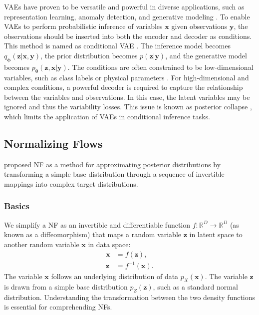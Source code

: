 \acp{VAE} have proven to be versatile and powerful in
diverse applications, such as representation learning, anomaly detection, and generative modeling \citep{Mienye2025}. To enable \acp{VAE} to perform probabilistic inference of variables $\boldsymbol{x}$ given observations $\boldsymbol{y}$, the observations should be inserted into both the encoder and decoder as conditions. This method is named as conditional \ac{VAE} \citep{sohn2015cvae}. The inference model becomes $q_{\boldsymbol{\phi}}(\boldsymbol{z}|\boldsymbol{x}, \boldsymbol{y})$, the prior distribution becomes $p(\boldsymbol{z}|\boldsymbol{y})$, and the generative model becomes $p_{\boldsymbol{\theta}}(\boldsymbol{z}, \boldsymbol{x}|\boldsymbol{y})$. The conditions are often constrained to be low-dimensional variables, such as class labels \citep{sohn2015cvae} or physical parameters \citep{martínezpalomera2020pelsvae}. For high-dimensional and complex conditions, a powerful decoder is required to capture the relationship between the variables and observations. In this case, the latent variables may be ignored and thus the variability losses. This issue is known as posterior collapse \citep{bowman2016cvae, mccarthy2020cvae}, which limits the application of \acp{VAE} in conditional inference tasks.

\subsection{Normalizing Flows}
\citeauthor{rezende2016} \citeyearpar{rezende2016} proposed \acf{NF} as a method for approximating posterior distributions by transforming a simple base distribution through a sequence of invertible mappings into complex target distributions. 

\subsubsection{Basics}
We simplify a \ac{NF} as an invertible and differentiable function $f:\mathbb{R}^D\rightarrow\mathbb{R}^D$ (as known as a diffeomorphism) that maps a random variable $\boldsymbol{z}$ in latent space to another random variable $\boldsymbol{x}$ in data space:
\begin{subequations}
    \begin{align}
        \label{eq:xfz}
        \boldsymbol{x} &= f(\boldsymbol{z}),\\
        \label{eq:zfx}
        \boldsymbol{z} &= f^{-1}(\boldsymbol{x}).
    \end{align}
\end{subequations}
The variable $\boldsymbol{x}$ follows an underlying distribution of data $p_X(\boldsymbol{x})$. The variable $\boldsymbol{z}$ is drawn from a simple base distribution $p_Z(\boldsymbol{z})$, such as a standard normal distribution. Understanding the transformation between the two density functions is essential for comprehending \acp{NF}. 
